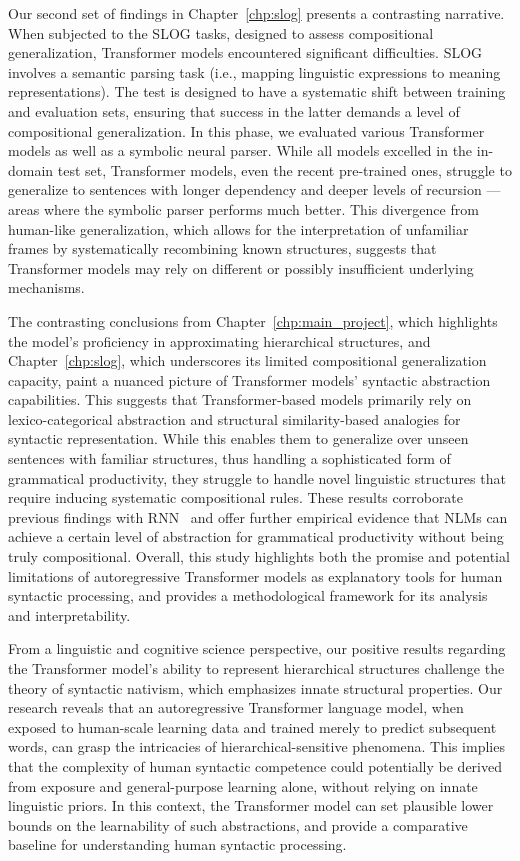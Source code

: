 Our second set of findings in Chapter~\ref{chp:slog} presents a contrasting narrative. When subjected to the SLOG tasks, designed to assess compositional generalization, Transformer models encountered significant difficulties. SLOG involves a semantic parsing task (i.e., mapping linguistic expressions to meaning representations).
The test is designed to have a systematic shift between training and evaluation sets, ensuring that success in the latter demands a level of compositional generalization. In this phase, we evaluated various Transformer models as well as a symbolic neural parser. While all models excelled in the in-domain test set, Transformer models, even the recent pre-trained ones, struggle to generalize to sentences with longer dependency and deeper levels of recursion --- areas where the symbolic parser performs much better. This divergence from human-like generalization, which allows for the interpretation of unfamiliar frames by systematically recombining known structures, suggests that Transformer models may rely on different or possibly insufficient underlying mechanisms.



The contrasting conclusions from Chapter~\ref{chp:main_project}, which highlights the model's proficiency in approximating hierarchical structures, and Chapter~\ref{chp:slog}, which underscores its limited compositional generalization capacity, paint a nuanced picture of Transformer models' syntactic abstraction capabilities. This suggests that Transformer-based models primarily rely on lexico-categorical abstraction and structural similarity-based analogies for syntactic representation. While this enables them to generalize over unseen sentences with familiar structures, thus handling a sophisticated form of grammatical productivity, they struggle to handle novel linguistic structures that require inducing systematic compositional rules. These results corroborate previous findings with RNN~\citep{baroni2020linguistic} and offer further empirical evidence that NLMs can achieve a certain level of abstraction for grammatical productivity without being truly compositional. Overall, this study highlights both the promise and potential limitations of autoregressive Transformer models as explanatory tools for human syntactic processing, and provides a methodological framework for its analysis and interpretability.

From a linguistic and cognitive science perspective, our positive results regarding the Transformer model's ability to represent hierarchical structures challenge the theory of syntactic nativism, which emphasizes innate structural properties. Our research reveals that an autoregressive Transformer language model, when exposed to human-scale learning data and trained merely to predict subsequent words, can grasp the intricacies of hierarchical-sensitive phenomena. This implies that the complexity of human syntactic competence could potentially be derived from exposure and general-purpose learning alone, without relying on innate linguistic priors. In this context, the Transformer model can set plausible lower bounds on the learnability of such abstractions, and provide a comparative baseline for understanding human syntactic processing. 

